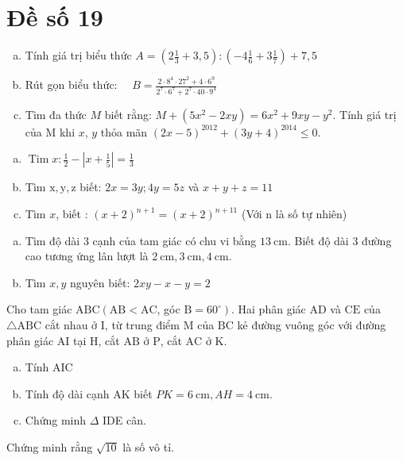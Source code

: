 \onehalfspacing
\section{Đề số 19}
\graphicspath{{./img/}}
\begin{bt} 
    \hfil
    \begin{enumerate}[a.]
        \item Tính giá trị biểu thức $A=\left(2 \frac{1}{3}+3,5\right):\left(-4 \frac{1}{6}+3 \frac{1}{7}\right)+7,5$
        \item Rút gọn biểu thức: $\quad B=\frac{2 \cdot 8^4 \cdot 27^2+4 \cdot 6^9}{2^7 \cdot 6^7+2^7 \cdot 40 \cdot 9^4}$
        \item Tìm đa thức $M$ biết rằng: $M+\left(5 x^2-2 x y\right)=6 x^2+9 x y-y^2$.
        Tính giá trị của M khi $x$, $y$ thỏa mãn $(2 x-5)^{2012}+(3 y+4)^{2014} \leq 0$.
    \end{enumerate}
\loigiai{}
\end{bt}

\begin{bt}
    \hfill
	\begin{enumerate}[a.]
        \item $\operatorname{Tim} x: \frac{1}{2}-\left|x+\frac{1}{5}\right|=\frac{1}{3}$
        \item Tìm $\mathrm{x}, \mathrm{y}, \mathrm{z}$ biết: $2 x=3 y ; 4 y=5 z$ và $x+y+z=11$
        \item Tìm $x$, biết : $(x+2)^{n+1}=(x+2)^{n+11}$ (Với $\mathrm{n}$ là số tự nhiên)
    \end{enumerate}
	\loigiai{} 
\end{bt}

\begin{bt}
    \hfill
	\begin{enumerate}[a.]
        \item Tìm độ dài 3 cạnh của tam giác có chu vi bằng $13 \mathrm{~cm}$. Biết độ dài 3 đường cao tương ứng lân lượt là $2 \mathrm{~cm}, 3 \mathrm{~cm}, 4 \mathrm{~cm}$.
        \item Tìm $x, y$ nguyên biết: $2 x y-x-y=2$
    \end{enumerate}
	\loigiai{}
\end{bt}

\begin{bt}
    Cho tam giác $\mathrm{ABC}\left(\mathrm{AB}<\mathrm{AC}\right.$, góc $\left.\mathrm{B}=60^{\circ}\right)$. Hai phân giác $\mathrm{AD}$ và $\mathrm{CE}$ của $\triangle \mathrm{ABC}$ cắt nhau ở $\mathrm{I}$, từ trung điểm $\mathrm{M}$ của $\mathrm{BC}$ kẻ đường vuông góc với đường phân giác $\mathrm{AI}$ tại $\mathrm{H}$, cắt $\mathrm{AB}$ ở $\mathrm{P}$, cắt $\mathrm{AC}$ ở $\mathrm{K}$.
    \begin{enumerate}[a.]
        \item  Tính AIC
        \item Tính độ dài cạnh $\mathrm{AK}$ biết $P K=6 \mathrm{~cm}, A H=4 \mathrm{~cm}$.
        \item Chứng minh $\Delta$ IDE cân.
    \end{enumerate}
\loigiai{}
\end{bt}

\begin{bt}
    Chứng minh rằng $\sqrt{10}$ là số vô tỉ.
\loigiai{}
\end{bt}

